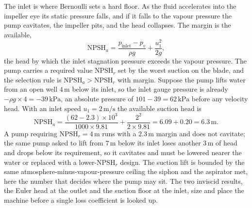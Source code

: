 The inlet is where Bernoulli sets a hard floor. As the fluid
accelerates into the impeller eye its static pressure falls, and if it
falls to the vapour pressure the pump cavitates, the impeller pits, and
the head collapses. The margin is the  available,
\[
\text{NPSH}_a = \frac{p_\text{inlet} - p_v}{\rho g} + \frac{u_1^2}{2g},
\]
the head by which the inlet stagnation pressure exceeds the vapour
pressure. The pump carries a required value $\text{NPSH}_r$ set by the
worst suction on the blade, and the selection rule is $\text{NPSH}_a >
\text{NPSH}_r$ with margin. Suppose the pump lifts water from an open
well $4\,\si{\meter}$ below its inlet, so the inlet gauge pressure is
already $-\rho g\times 4 = -39\,\text{kPa}$, an absolute pressure of
$101 - 39 = 62\,\text{kPa}$ before any velocity head. With an inlet
speed $u_1 = 2\,\si{\meter\per\second}$ the available suction head is
\[
\text{NPSH}_a = \frac{(62 - 2.3)\times 10^3}{1000\times 9.81}
+ \frac{2^2}{2\times 9.81}
= 6.09 + 0.20 = 6.3\,\si{\meter}.
\]
A pump requiring $\text{NPSH}_r = 4\,\si{\meter}$ runs with a
$2.3\,\si{\meter}$ margin and does not cavitate; the same pump asked to
lift from $7\,\si{\meter}$ below its inlet loses another
$3\,\si{\meter}$ of head and drops below its requirement, so it
cavitates and must be lowered nearer the water or replaced with a
lower-$\text{NPSH}_r$ design. The suction lift is bounded by the same
atmosphere-minus-vapour-pressure ceiling the siphon and the aspirator
met, here the number that decides where the pump may sit. The two
inviscid results, the Euler head at the outlet and the suction floor at
the inlet, size and place the machine before a single loss coefficient
is looked up.

